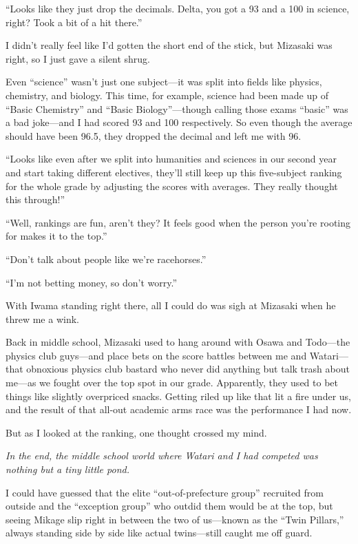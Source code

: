 \documentclass[
    a4paper,
    12pt,
    twoside,
    openany,
    UTF8,
    fontset=windows
]{ctexbook}
\begin{document}
``Looks like they just drop the decimals. Delta, you got a 93 and a 100 in science, right? Took a bit of a hit there.''

I didn't really feel like I'd gotten the short end of the stick, but Mizasaki was right, so I just gave a silent shrug.

Even ``science'' wasn't just one subject---it was split into fields like physics, chemistry, and biology. This time, for example, science had been made up of ``Basic Chemistry'' and ``Basic Biology''---though calling those exams ``basic'' was a bad joke---and I had scored 93 and 100 respectively. So even though the average should have been 96.5, they dropped the decimal and left me with 96.

``Looks like even after we split into humanities and sciences in our second year and start taking different electives, they'll still keep up this five-subject ranking for the whole grade by adjusting the scores with averages. They really thought this through!''

``Well, rankings are fun, aren't they? It feels good when the person you're rooting for makes it to the top.''

``Don't talk about people like we're racehorses.''

``I'm not betting money, so don't worry.''

With Iwama standing right there, all I could do was sigh at Mizasaki when he threw me a wink.

Back in middle school, Mizasaki used to hang around with Osawa and Todo---the physics club guys---and place bets on the score battles between me and Watari---that obnoxious physics club bastard who never did anything but talk trash about me---as we fought over the top spot in our grade. Apparently, they used to bet things like slightly overpriced snacks. Getting riled up like that lit a fire under us, and the result of that all-out academic arms race was the performance I had now.

But as I looked at the ranking, one thought crossed my mind.

\textit{In the end, the middle school world where Watari and I had competed was nothing but a tiny little pond.}

I could have guessed that the elite ``out-of-prefecture group'' recruited from outside and the ``exception group'' who outdid them would be at the top, but seeing Mikage slip right in between the two of us---known as the ``Twin Pillars,'' always standing side by side like actual twins---still caught me off guard.
\end{document}
